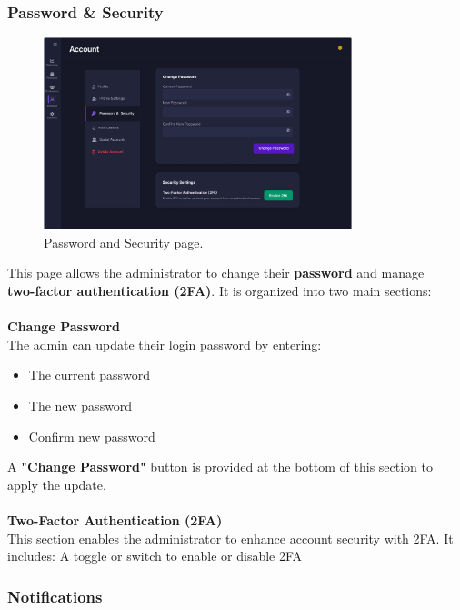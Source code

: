\documentclass[12pt]{article}
\begin{document}
	\subsubsection{Password \& Security}
	\begin{figure}[H]
		\centering
		\includegraphics[width=0.8\textwidth]{pictures/admin/Password_Admin}
		\caption{Password and Security page.}\label{fig:figure6}
	\end{figure}
	This page allows the administrator to change their \textbf{password} and manage \\ \textbf{two-factor authentication (2FA)}.
	It is organized into two main sections: \\ \\
	\textbf{Change Password} \\
	The admin can update their login password by entering:
	\begin{itemize}
		\item The current password
		\item The new password
		\item Confirm new password
	\end{itemize}
	A \textbf{"Change Password"} button is provided at the bottom of this section to apply the update. \\ \\
	\textbf{Two-Factor Authentication (2FA)} \\
	This section enables the administrator to enhance account security with 2FA. It includes: A toggle or switch to enable or disable 2FA

	\subsubsection{Notifications}
	
\end{document}
